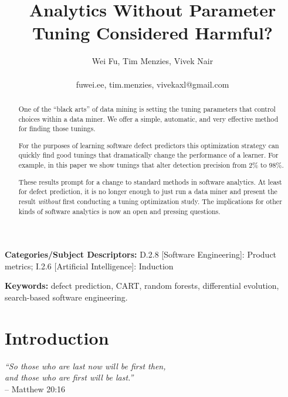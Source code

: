 \documentclass{sig-alternative}
\begin{document}
\title{ Analytics Without Parameter Tuning Considered Harmful?}
\author{\alignauthor Wei Fu, Tim Menzies, Vivek Nair\\
       \\
       fuwei.ee, tim.menzies, vivekaxl@gmail.com}
\maketitle
\begin{abstract}
One of the ``black arts'' of data mining is setting the tuning
parameters that control   choices within a data miner.  We offer a simple,
automatic, and very effective  method for finding those tunings.

For the purposes of learning
software defect predictors this optimization strategy can quickly
find  good tunings that  dramatically change   the performance of a learner.
For example,
in this paper we show   tunings that  alter detection  precision  
 from 2\% to 98\%.

These results prompt for a change to standard methods in software analytics.
At least for defect prediction, 
it is no longer enough to just run a data miner and present the result
{\em without} first conducting a tuning optimization study.
The implications for other kinds of software analytics is now an open and pressing questions.


\end{abstract}

\vspace{1mm}
\noindent
{\bf Categories/Subject Descriptors:} 
D.2.8 [Software Engineering]: Product metrics;
I.2.6 [Artificial Intelligence]: Induction

 
\vspace{1mm}
\noindent
{\bf Keywords:} defect prediction, CART, random forests,
differential evolution,
search-based software engineering.

\section{Introduction}

\begin{raggedleft}
{\em ``So those who are last now will be first then, \\
and those who are first will be last.''}\\ 
-- Matthew 20:16

 \end{raggedleft}
\end{document}
